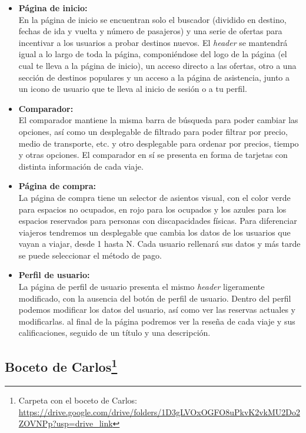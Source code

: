 \begin{itemize}
      \item\textbf{Página de inicio:} \\ En la página de inicio se encuentran solo el buscador (dividido en destino, fechas de ida y vuelta y número de pasajeros) y una serie de ofertas para incentivar a los usuarios a probar destinos nuevos. El \textit{header} se mantendrá igual a lo largo de toda la página, componiéndose del logo de la página (el cual te lleva a la página de inicio), un acceso directo a las ofertas, otro a una sección de destinos populares y un acceso a la página de asistencia, junto a un icono de usuario que te lleva al inicio de sesión o a tu perfil.
      \item\textbf{Comparador:} \\ El comparador mantiene la misma barra de búsqueda para poder cambiar las opciones, así como un desplegable de filtrado para poder filtrar por precio, medio de transporte, etc. y otro desplegable para ordenar por precios, tiempo y otras opciones. El comparador en sí se presenta en forma de tarjetas con distinta información de cada viaje.
      \item\textbf{Página de compra:} \\ La página de compra tiene un selector de asientos visual, con el color verde para espacios no ocupados, en rojo para los ocupados y los azules para los espacios reservados para personas con discapacidades físicas. Para diferenciar viajeros tendremos un desplegable que cambia los datos de los usuarios que vayan a viajar, desde 1 hasta N. Cada usuario rellenará sus datos y más tarde se puede seleccionar el método de pago.
      \item\textbf{Perfil de usuario:} \\ La página de perfil de usuario presenta el mismo \textit{header} ligeramente modificado, con la ausencia del botón de perfil de usuario. Dentro del perfil podemos modificar los datos del usuario, así como ver las reservas actuales y modificarlas. al final de la página podremos ver la reseña de cada viaje y sus calificaciones, seguido de un título y una descripción.
\end{itemize}

\subsection[Boceto de Carlos]{Boceto de Carlos\footnote{Carpeta con el boceto de Carlos: \url{https://drive.google.com/drive/folders/1D3gLVOxOGFO8uPkvK2vkMU2Do2ZOVNPp?usp=drive_link}}}

